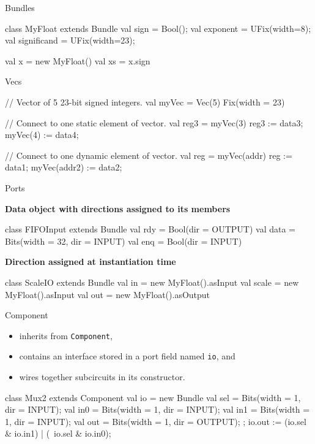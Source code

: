 \documentclass[xcolor=pdflatex,dvipsnames,table]{beamer}
\begin{document}
\begin{frame}[fragile]{Bundles}
\begin{scala}
class MyFloat extends Bundle{
  val sign        = Bool();
  val exponent    = UFix(width=8);
  val significand = UFix(width=23);
}

val x  = new MyFloat()
val xs = x.sign
\end{scala}
\end{frame}

\begin{frame}[fragile]{Vecs}
\begin{scala}
// Vector of 5 23-bit signed integers.
val myVec = Vec(5) { Fix(width = 23) } 

// Connect to one static element of vector.
val reg3  = myVec(3)                   
reg3     := data3; 
myVec(4) := data4;

// Connect to one dynamic element of vector.
val reg       = myVec(addr)
reg          := data1;
myVec(addr2) := data2;
\end{scala}
\end{frame}

\begin{frame}[fragile]{Ports}

\textbf{Data object with directions assigned to its members}

\begin{scala}
class FIFOInput extends Bundle {
  val rdy  = Bool(dir = OUTPUT)
  val data = Bits(width = 32, dir = INPUT)
  val enq  = Bool(dir = INPUT)
}
\end{scala}

\textbf{Direction assigned at instantiation time}

\begin{scala}
class ScaleIO extends Bundle {
  val in    = new MyFloat().asInput
  val scale = new MyFloat().asInput
  val out   = new MyFloat().asOutput
}
\end{scala}
\end{frame}

\begin{frame}{Component}

\begin{itemize}
\item inherits from \verb+Component+,
\item contains an interface stored in a port field named \verb+io+, and
\item wires together subcircuits in its constructor.
\end{itemize}

\begin{scala}
class Mux2 extends Component {
  val io = new Bundle{
    val sel = Bits(width = 1, dir = INPUT);
    val in0 = Bits(width = 1, dir = INPUT);
    val in1 = Bits(width = 1, dir = INPUT);
    val out = Bits(width = 1, dir = OUTPUT);
  };
  io.out := (io.sel & io.in1) | (~io.sel & io.in0);
}
\end{scala}

\end{frame}
\end{document}

